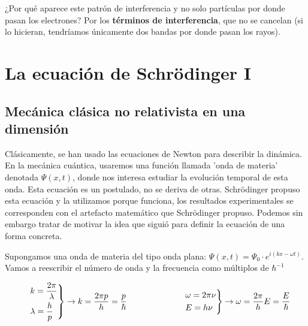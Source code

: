 \documentclass{report}
\begin{document}
    \noindent ¿Por qué aparece este patrón de interferencia y no solo partículas por donde pasan
    los electrones? Por los \textbf{términos de interferencia}, que no se cancelan (si lo 
    hicieran, tendríamos únicamente dos bandas por donde pasan los rayos).
\chapter{La ecuación de Schrödinger I}
  \section{Mecánica clásica no relativista en una dimensión}
    \noindent Clásicamente, se han usado las ecuaciones de Newton para describir la dinámica.
    En la mecánica cuántica, usaremos una función llamada 'onda de materia' denotada
    $\Psi(x,t)$, donde nos interesa estudiar la evolución temporal de esta onda. Esta ecuación
    es un postulado, no se deriva de otras. Schrödinger propuso esta ecuación y la utilizamos
    porque funciona, los resultados experimentales se corresponden con el artefacto matemático
    que Schrödinger propuso. Podemos sin embargo tratar de motivar la idea que siguió para definir 
    la ecuación de una forma concreta.\\


    \noindent Supongamos una onda de materia del tipo onda plana: $\Psi(x,t)=\Psi_0\cdot e^{i(kx-\omega t)}$.
    Vamos a reescribir el número de onda y la frecuencia como múltiplos de $\hbar^{-1}$

    \begin{equation}
      \begin{rcases}
        &k=\dfrac{2\pi}{\lambda}\\
        &\lambda= \dfrac{h}{p}
      \end{rcases} \rightarrow k=\dfrac{2\pi p}{h}=\dfrac{p}{\hbar}
      \hspace{2cm}
      \begin{rcases}
        &\omega=2\pi\nu\\
        &E=h\nu
      \end{rcases}\rightarrow\omega=\dfrac{2\pi}{h}E=\dfrac{E}{\hbar}
    \end{equation}
\end{document}
